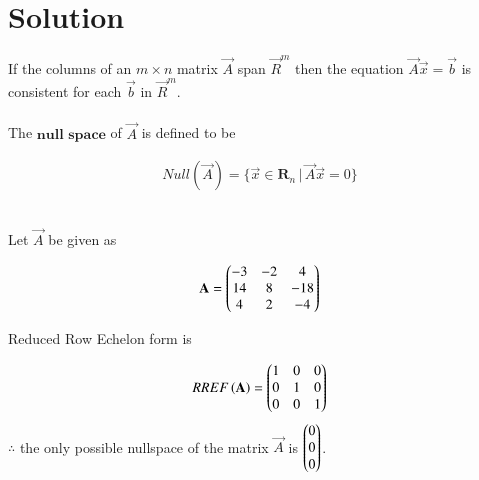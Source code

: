 \documentclass[journal,12pt,twocolumn]{IEEEtran}
\begin{document}
	\section{\textbf{Solution}}
	If the columns of an $m\times n$ matrix $\Vec{A}$ span $\vec{R}^{m}$ then the equation $\vec{A}\vec{x}=\vec{b}$ is consistent for each $\Vec{b}$ in $\vec{R}^{m}$. \\ \\
	The $\textbf{null space}$ of $\vec{A}$ is defined to be 
	
	\begin{align}\label{eq1}
		Null(\vec{A}) = \{ \vec{x} \in \mathbf{R}_{n} \, \vert \, \vec{A}\vec{x} = 0 \}
	\end{align}
	
	
	\\
	
	Let $\vec{A}$ be given as
	
	\begin{align} \label{eq2}
		\mathbf{A} = \begin{pmatrix}-3&-2&4 \\ 14&8&-18 \\ 4&2&-4\end{pmatrix}
	\end{align}
	
	Reduced Row Echelon form is
	
	\begin{align}
		RREF\left(\mathbf{A}\right) = \begin{pmatrix}1&0&0 \\ 0&1&0 \\ 0&0&1\end{pmatrix}
	\end{align}
	$\therefore$ the only possible nullspace of the matrix $\vec{A}$ is $\begin{pmatrix}0\\0\\0\end{pmatrix}$.
	
\end{document}
